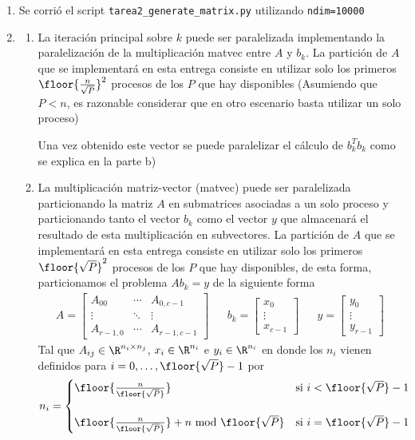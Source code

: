 \begin{enumerate}[label=\bf\arabic*.]
	\item Se corrió el script \texttt{tarea2\_generate\_matrix.py} utilizando \texttt{ndim=10000}
	\item \begin{enumerate}[label=\alph*)]
			\item La iteración principal sobre $k$ puede ser paralelizada implementando la paralelización de la multiplicación matvec entre $A$ y $b_k$. La partición de $A$ que se implementará en esta entrega consiste en utilizar solo los primeros $\floor{\frac{n}{\sqrt{P}}}^2$ procesos de los $P$ que hay disponibles (Asumiendo que $P < n$, es razonable considerar que en otro escenario basta utilizar un solo proceso) 

			Una vez obtenido este vector se puede paralelizar el cálculo de $b_k^Tb_k$ como se explica en la parte b)
		\item La multiplicación matriz-vector (matvec) puede ser paralelizada particionando la matriz $A$ en submatrices asociadas a un solo proceso y particionando tanto el vector $b_k$ como el vector $y$ que almacenará el resultado de esta multiplicación en subvectores. La partición de $A$ que se implementará en esta entrega consiste en utilizar solo los primeros $\floor{\sqrt{P}}^2$ procesos de los $P$ que hay disponibles, de esta forma, particionamos el problema $Ab_k = y$ de la siguiente forma
			\begin{align*}
				A = \begin{bmatrix}
					A_{00} & \cdots & A_{0,c-1} \\
					\vdots & \ddots & \vdots \\
					A_{r-1,0}   & \cdots & A_{r-1,c-1}
				\end{bmatrix} && b_k=\begin{bmatrix}
					x_0 \\ \vdots \\ x_{c-1}
				\end{bmatrix}
				&& y = \begin{bmatrix}
					y_0 \\ \vdots \\ y_{r-1}
				\end{bmatrix}
			\end{align*}
			Tal que $A_{ij} \in \R^{n_{i}\times n_{j}}$, $x_i \in \R^{n_i}$ e $y_i \in \R^{n_i}$ en donde los $n_i$ vienen definidos para $i=0,\dots,\floor{\sqrt{P}}-1$ por
			\[
				n_i = \begin{cases}
					\floor{\frac{n}{\floor{\sqrt{P}}}} & \text{si } i < \floor{\sqrt{P}} - 1 \\
					\ \\
					\floor{\frac{n}{\floor{\sqrt{P}}}} + n \text{ mod } \floor{\sqrt{P}} & \text{si } i = \floor{\sqrt{P}} - 1
				\end{cases}
			\]



\end{enumerate}
\end{enumerate}

